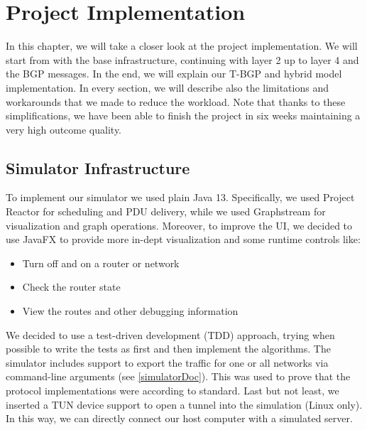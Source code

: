 \chapter{Project Implementation}
In this chapter, we will take a closer look at the project implementation.
We will start from with the base infrastructure, continuing with layer 2 up to layer 4 and the BGP messages.
In the end, we will explain our T-BGP and hybrid model implementation.\newline
In every section, we will describe also the limitations and workarounds that we made to reduce the workload.
Note that thanks to these simplifications, we have been able to finish the project in six weeks maintaining a very high outcome quality.

\section{Simulator Infrastructure}
To implement our simulator we used plain Java 13.
Specifically, we used Project Reactor for scheduling and PDU delivery, while we used Graphstream for visualization and graph operations.
Moreover, to improve the UI, we decided to use JavaFX to provide more in-dept visualization and some runtime controls like:
\begin{itemize}
    \item Turn off and on a router or network
    \item Check the router state
    \item View the routes and other debugging information
\end{itemize}
We decided to use a test-driven development (TDD) approach, trying when possible to write the tests as first and then implement the algorithms. \newline
The simulator includes support to export the traffic for one or all networks via command-line arguments (see \ref{simulatorDoc}). This was used to prove that the protocol implementations were according to standard.\newline
Last but not least, we inserted a TUN device support to open a tunnel into the simulation (Linux only).
In this way, we can directly connect our host computer with a simulated server.

